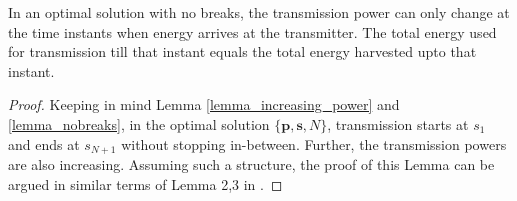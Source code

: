 %
%
%
%
%

\begin{lemma}
In an optimal solution with no breaks, the transmission power can only change at the time instants when energy arrives at the transmitter. The total energy used for transmission till that instant equals the total energy harvested upto that instant.
\label{lemma_energy_consumed} 
\end{lemma}
\begin{proof}
Keeping in mind Lemma \ref{lemma_increasing_power} and \ref{lemma_nobreaks}, in the optimal solution $\{\textbf{p}, \textbf{s}, N\}$, transmission starts at $s_1$ and ends at $s_{N+1}$ without stopping in-between. Further, the transmission powers are also increasing. Assuming such a structure, the proof of this Lemma can be argued in similar terms of Lemma 2,3 in \cite{Yang}. 
\end{proof}	

